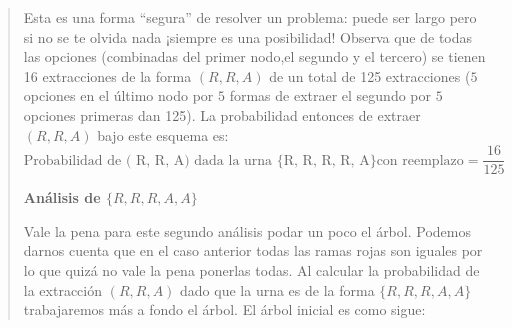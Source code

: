 \documentclass[
]{book}
\begin{document}
\begin{quote}
Esta es una forma ``segura'' de resolver un problema: puede ser largo pero si no se te olvida nada ¡siempre es una posibilidad! Observa que de todas las opciones (combinadas del primer nodo,el segundo y el tercero) se tienen 16 extracciones de la forma \(( R, R, A)\) de un total de 125 extracciones (\(5\) opciones en el último nodo por \(5\) formas de extraer el segundo por \(5\) opciones primeras dan 125). La probabilidad entonces de extraer \(( R, R, A)\) bajo este esquema es:
\[
\textrm{Probabilidad de ( R, R, A) dada la urna \{ R, R, R, R, A\} con reemplazo} =  \dfrac{16}{125} 
\]

\textbf{Análisis de \(\{ R, R, R, A, A\}\)}

Vale la pena para este segundo análisis podar un poco el árbol. Podemos darnos cuenta que en el caso anterior todas las ramas rojas son iguales por lo que quizá no vale la pena ponerlas todas. Al calcular la probabilidad de la extracción \(( R, R, A)\) dado que la urna es de la forma \(\{ R, R, R, A, A\}\) trabajaremos más a fondo el árbol. El árbol inicial es como sigue:


\end{quote}
\end{document}
